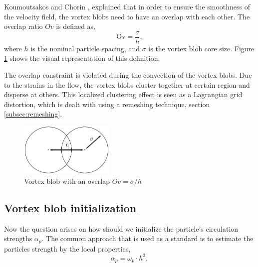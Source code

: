 Koumoutsakos and Chorin \cite{Cottet2000a}, explained that in order to ensure the smoothness of the velocity field, the vortex blobs need to have an overlap with each other. The overlap ratio $Ov$ is defined as,
	\begin{equation}
	\mathrm{Ov} = \frac{\sigma}{h},
	\label{eq:overlapRatio}
	\end{equation}
where $h$ is the nominal particle spacing, and $\sigma$ is the vortex blob core size. Figure \ref{fig:blobOverlap} shows the visual representation of this definition. 

The overlap constraint is violated during the convection of the vortex blobs. Due to the strains in the flow, the vortex blobs cluster together at certain region and disperse at others. This localized clustering effect is seen as a Lagrangian grid distortion, which is dealt with using a remeshing technique, section \ref{subsec:remeshing}.

	\begin{figure}[!t]
	\centering
	\includegraphics[width=0.4\textwidth]{figures/lagrangian/blobOverlap.pdf}
	\caption{Vortex blob with an overlap $Ov = \sigma/h$}
	\label{fig:blobOverlap}
	\end{figure}

\subsection{Vortex blob initialization}
\label{subsec:vortexBlobInitialization}
Now the question arises on how should we initialize the particle's circulation strengths $\alpha_p$. The common approach that is used as a standard is to estimate the particles strength by the local properties,
	\begin{equation}
	\alpha_p = \omega_p\cdot h^2,
	\label{eq:particleCirculationAssignment}
	\end{equation}


